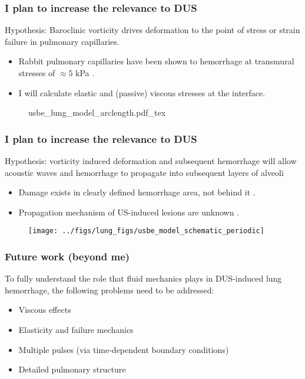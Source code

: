 \begin{frame}\frametitle{\vspace*{0.5cm}I plan to increase the relevance to DUS}
  Hypothesis: Baroclinic vorticity drives deformation to the point of
  stress or strain failure in pulmonary capillaries.
  \begin{itemize}
  \item Rabbit pulmonary capillaries have been shown to hemorrhage at transmural stresses of $\approx 5$ kPa \citep{West1991}.
  \item I will calculate elastic and (passive) viscous stresses at the interface.\vfill%
    \vspace*{5pt}
  \end{itemize}
  \begin{figure}
    \centering
    \def\svgwidth{0.4\textwidth}%
    {\tiny
      {usbe_lung_model_arclength.pdf_tex}%
    }
  \end{figure}
\end{frame}

\begin{frame}\frametitle{\vspace*{0.5cm}I plan to increase the relevance to DUS}
  Hypothesis: vorticity induced deformation and subsequent hemorrhage will allow acoustic waves and hemorrhage to propagate into
  subsequent layers of alveoli\\
  \begin{itemize}
  \item Damage exists in clearly defined hemorrhage area, not behind it \citep{Penney1993a}.
  \item Propagation mechanism of US-induced lesions are unknown \citep{Zachary2006}.
  \end{itemize}
  \begin{figure}
    \centering
    \texttt{[image: ../figs/lung\_figs/usbe\_model\_schematic\_periodic]}
  \end{figure}
\end{frame}

\begin{frame}\frametitle{Future work (beyond me)}
  To fully understand the role that fluid mechanics plays in DUS-induced lung hemorrhage, the following problems need to be addressed:\\
  \vspace*{0.25cm}
  \begin{itemize}
  \item Viscous effects\vfill%
  \item Elasticity and failure mechanics\vfill%
  \item Multiple pulses (via time-dependent boundary conditions)\vfill%
  \item Detailed pulmonary structure\vfill%
  \end{itemize}
\end{frame}
%
